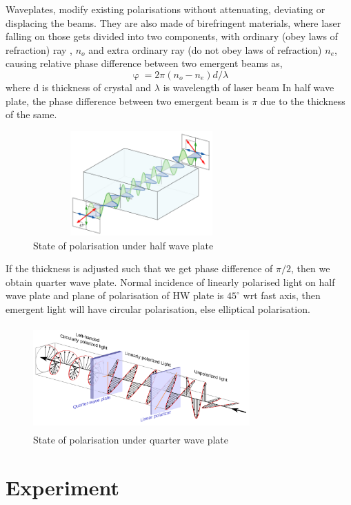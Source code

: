 \documentclass[a4paper, amsfonts, amssymb, amsmath, reprint, showkeys, nofootinbib, twoside]{revtex4-1}
\begin{document}
Waveplates, modify existing polarisations without attenuating, deviating or displacing the beams. They are also made of birefringent materials, where laser falling on those gets divided into two components, with ordinary (obey laws of refraction) ray , $n_o$ and extra ordinary ray (do not obey laws of refraction) $n_e$, causing relative phase difference between two emergent beams as,
\begin{equation}
	\upvarphi=2\pi(n_o-n_e)d/\lambda
\end{equation}
where d is thickness of crystal and $\lambda$ is wavelength of laser beam
 In half wave plate, the phase difference between two emergent beam is $\pi$ due to the thickness of the same.
 \begin{figure}[H] %
 	\centering
 	\includegraphics[width=8.3cm,height=4cm]{2} 
 	\caption{State of polarisation under half wave plate}
 	\label{2}
 \end{figure}

If the thickness is adjusted such that we get phase difference of $\pi/2$, then we obtain quarter wave plate. Normal incidence of linearly polarised light on half wave plate and plane of polarisation of HW plate is $45^{\circ}$ wrt fast axis, then emergent light will have circular polarisation, else elliptical polarisation.

 \begin{figure}[H] %
	\centering
	\includegraphics[width=8.3cm,height=4cm]{3} 
	\caption{State of polarisation under quarter wave plate}
	\label{3}
\end{figure}

\section{Experiment}
\end{document}
